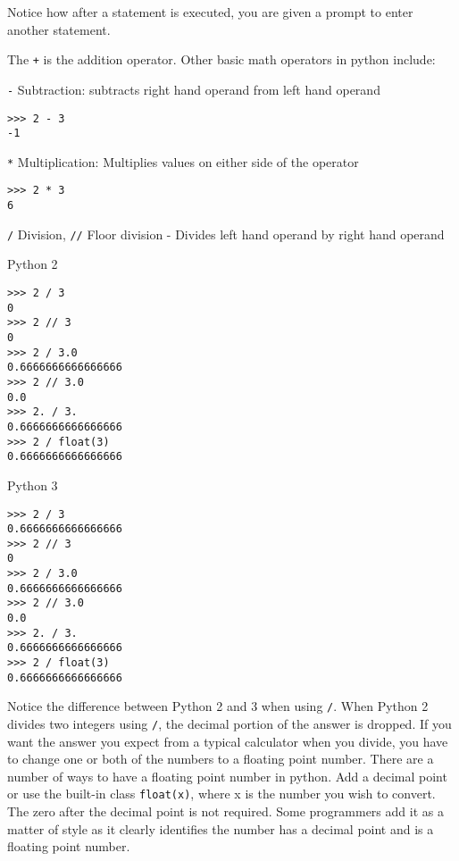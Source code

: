 \documentclass[12pt]{article}
\begin{document}
Notice how after a statement is executed, you are given a prompt to enter another statement.

The \texttt{+} is the addition operator. Other basic math operators in python include:

\texttt{-} Subtraction: subtracts right hand operand from left hand operand

\begin{lstlisting}[style=bash]
>>> 2 - 3
-1
\end{lstlisting}

\texttt{*} Multiplication: Multiplies values on either side of the operator

\begin{lstlisting}[style=bash]
>>> 2 * 3
6
\end{lstlisting}


\texttt{/} Division, \texttt{//} Floor division - Divides left hand operand by right hand operand
\\

\begin{minipage}{.5\linewidth}
Python 2
\begin{lstlisting}[style=bash]
>>> 2 / 3
0
>>> 2 // 3
0
>>> 2 / 3.0
0.6666666666666666
>>> 2 // 3.0
0.0
>>> 2. / 3.
0.6666666666666666
>>> 2 / float(3)
0.6666666666666666
\end{lstlisting}
\end{minipage}
\begin{minipage}{.5\linewidth}
Python 3
\begin{lstlisting}[style=bash]
>>> 2 / 3
0.6666666666666666
>>> 2 // 3
0
>>> 2 / 3.0
0.6666666666666666
>>> 2 // 3.0
0.0
>>> 2. / 3.
0.6666666666666666
>>> 2 / float(3)
0.6666666666666666
\end{lstlisting}
\end{minipage}

Notice the difference between Python 2 and 3 when using \texttt{/}. When Python 2 divides two integers using \texttt{/}, the decimal portion of the answer is dropped. If you want the answer you expect from a typical calculator when you divide, you have to change one or both of the numbers to a floating point number. There are a number of ways to have a floating point number in python. Add a decimal point or use the built-in class \texttt{float(x)}, where x is the number you wish to convert. The zero after the decimal point is not required. Some programmers add it as a matter of style as it clearly identifies the number has a decimal point and is a floating point number.
\end{document}
